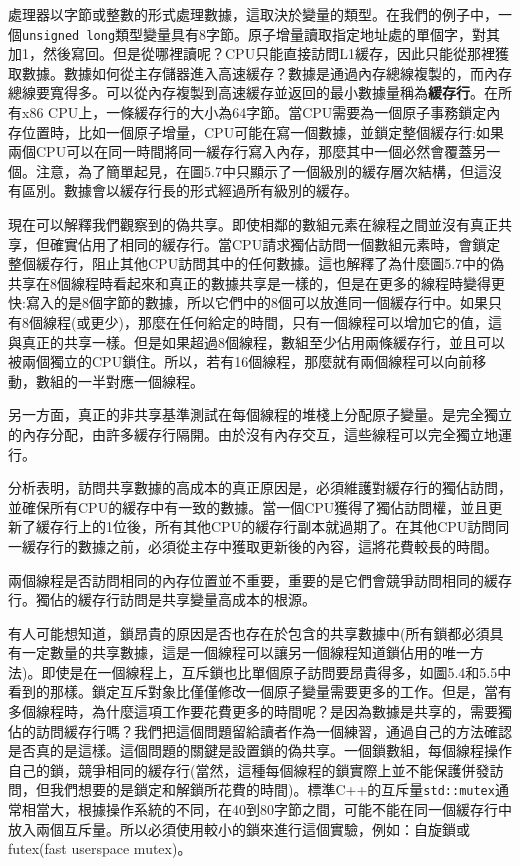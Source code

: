 處理器以字節或整數的形式處理數據，這取決於變量的類型。在我們的例子中，一個\texttt{unsigned long}類型變量具有8字節。原子增量讀取指定地址處的單個字，對其加1，然後寫回。但是從哪裡讀呢？CPU只能直接訪問L1緩存，因此只能從那裡獲取數據。數據如何從主存儲器進入高速緩存？數據是通過內存總線複製的，而內存總線要寬得多。可以從內存複製到高速緩存並返回的最小數據量稱為\textbf{緩存行}。在所有x86 CPU上，一條緩存行的大小為64字節。當CPU需要為一個原子事務鎖定內存位置時，比如一個原子增量，CPU可能在寫一個數據，並鎖定整個緩存行:如果兩個CPU可以在同一時間將同一緩存行寫入內存，那麼其中一個必然會覆蓋另一個。注意，為了簡單起見，在圖5.7中只顯示了一個級別的緩存層次結構，但這沒有區別。數據會以緩存行長的形式經過所有級別的緩存。

現在可以解釋我們觀察到的偽共享。即使相鄰的數組元素在線程之間並沒有真正共享，但確實佔用了相同的緩存行。當CPU請求獨佔訪問一個數組元素時，會鎖定整個緩存行，阻止其他CPU訪問其中的任何數據。這也解釋了為什麼圖5.7中的偽共享在8個線程時看起來和真正的數據共享是一樣的，但是在更多的線程時變得更快:寫入的是8個字節的數據，所以它們中的8個可以放進同一個緩存行中。如果只有8個線程(或更少)，那麼在任何給定的時間，只有一個線程可以增加它的值，這與真正的共享一樣。但是如果超過8個線程，數組至少佔用兩條緩存行，並且可以被兩個獨立的CPU鎖住。所以，若有16個線程，那麼就有兩個線程可以向前移動，數組的一半對應一個線程。

另一方面，真正的非共享基準測試在每個線程的堆棧上分配原子變量。是完全獨立的內存分配，由許多緩存行隔開。由於沒有內存交互，這些線程可以完全獨立地運行。

分析表明，訪問共享數據的高成本的真正原因是，必須維護對緩存行的獨佔訪問，並確保所有CPU的緩存中有一致的數據。當一個CPU獲得了獨佔訪問權，並且更新了緩存行上的1位後，所有其他CPU的緩存行副本就過期了。在其他CPU訪問同一緩存行的數據之前，必須從主存中獲取更新後的內容，這將花費較長的時間。

兩個線程是否訪問相同的內存位置並不重要，重要的是它們會競爭訪問相同的緩存行。獨佔的緩存行訪問是共享變量高成本的根源。

有人可能想知道，鎖昂貴的原因是否也存在於包含的共享數據中(所有鎖都必須具有一定數量的共享數據，這是一個線程可以讓另一個線程知道鎖佔用的唯一方法)。即使是在一個線程上，互斥鎖也比單個原子訪問要昂貴得多，如圖5.4和5.5中看到的那樣。鎖定互斥對象比僅僅修改一個原子變量需要更多的工作。但是，當有多個線程時，為什麼這項工作要花費更多的時間呢？是因為數據是共享的，需要獨佔的訪問緩存行嗎？我們把這個問題留給讀者作為一個練習，通過自己的方法確認是否真的是這樣。這個問題的關鍵是設置鎖的偽共享。一個鎖數組，每個線程操作自己的鎖，競爭相同的緩存行(當然，這種每個線程的鎖實際上並不能保護併發訪問，但我們想要的是鎖定和解鎖所花費的時間)。標準C++的互斥量\texttt{std::mutex}通常相當大，根據操作系統的不同，在40到80字節之間，可能不能在同一個緩存行中放入兩個互斥量。所以必須使用較小的鎖來進行這個實驗，例如：自旋鎖或futex(fast userspace mutex)。

